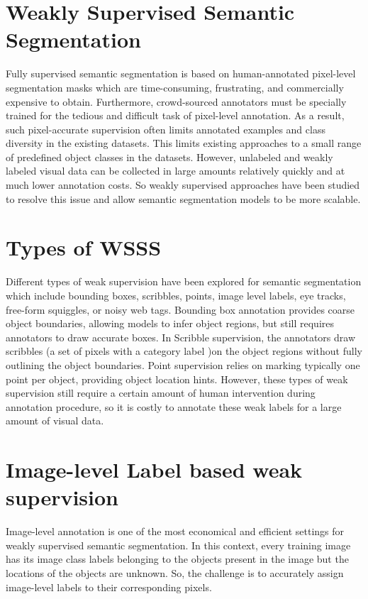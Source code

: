 
\section{Weakly Supervised Semantic Segmentation}
\label{sec:weakly-supervised}
Fully supervised semantic segmentation is based on human-annotated pixel-level segmentation masks which are time-consuming, frustrating, and commercially expensive to obtain. Furthermore, crowd-sourced annotators must be specially trained for the tedious and difficult task of pixel-level annotation. As a result, such pixel-accurate supervision often limits annotated examples and class diversity in the existing datasets. This limits existing approaches to a small range of predefined object classes in the datasets. However, unlabeled and weakly labeled visual data can be collected in large amounts relatively quickly and at much lower annotation costs. So weakly supervised approaches have been studied to resolve this issue and allow semantic segmentation models to be more scalable.

\section{Types of WSSS}
\label{sec:types-weakly-supervised}
Different types of weak supervision have been explored for semantic segmentation which include bounding boxes, scribbles, points, image level labels, eye tracks, free-form squiggles, or noisy web tags. Bounding box annotation provides coarse object boundaries, allowing models to infer object regions, but still requires annotators to draw accurate boxes. In Scribble supervision, the annotators draw scribbles (a set of pixels with a category label )on the object regions without fully outlining the object boundaries. Point supervision relies on marking typically one point per object, providing object location hints. However, these types of weak supervision still require a certain amount of human intervention during annotation procedure, so it is costly to annotate these weak labels for a large amount of visual data. 


\section{Image-level Label based weak supervision}
\label{sec:image-level-label}
Image-level annotation is one of the most economical and efficient settings for weakly supervised semantic segmentation. In this context, every training image has its image class labels belonging to the objects present in the image but the locations of the objects are unknown. So, the challenge is to accurately assign image-level labels to their corresponding pixels.


